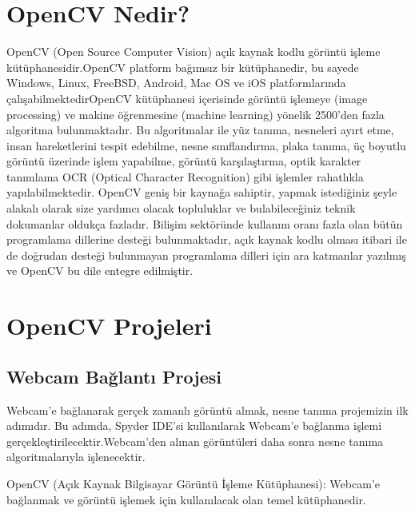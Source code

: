 \documentclass[11pt,a4paper]{report}
\begin{document}
	\section{OpenCV Nedir?}
	OpenCV (Open Source Computer Vision) açık kaynak kodlu görüntü işleme kütüphanesidir.OpenCV platform bağımsız bir kütüphanedir, bu sayede Windows, Linux, FreeBSD, Android, Mac OS ve iOS platformlarında çalışabilmektedirOpenCV kütüphanesi içerisinde görüntü işlemeye (image processing) ve makine öğrenmesine (machine learning) yönelik 2500’den fazla algoritma bulunmaktadır. Bu algoritmalar ile yüz tanıma, nesneleri ayırt etme, insan hareketlerini tespit edebilme, nesne sınıflandırma, plaka tanıma, üç boyutlu görüntü üzerinde işlem yapabilme, görüntü karşılaştırma, optik karakter tanımlama OCR (Optical Character Recognition)	gibi işlemler rahatlıkla yapılabilmektedir. OpenCV geniş bir kaynağa sahiptir, yapmak istediğiniz şeyle alakalı olarak size yardımcı olacak topluluklar ve bulabileceğiniz teknik dokumanlar oldukça fazladır. Bilişim sektöründe kullanım oranı fazla olan bütün programlama dillerine desteği bulunmaktadır, açık kaynak kodlu olması itibari ile de doğrudan desteği bulunmayan programlama dilleri için ara katmanlar yazılmış ve OpenCV bu dile entegre edilmiştir.\cite{picskin2016opencv}
	
	\section{OpenCV Projeleri}
	\subsection{Webcam Bağlantı Projesi}
	Webcam'e bağlanarak gerçek zamanlı görüntü almak, nesne tanıma projemizin ilk adımıdır. Bu adımda, Spyder IDE'si kullanılarak Webcam'e bağlanma işlemi gerçekleştirilecektir.Webcam'den alınan görüntüleri daha sonra nesne tanıma algoritmalarıyla işlenecektir.
	
	OpenCV (Açık Kaynak Bilgisayar Görüntü İşleme Kütüphanesi): Webcam'e bağlanmak ve görüntü işlemek için kullanılacak olan temel kütüphanedir.
	
	\newpage
	
\end{document}
